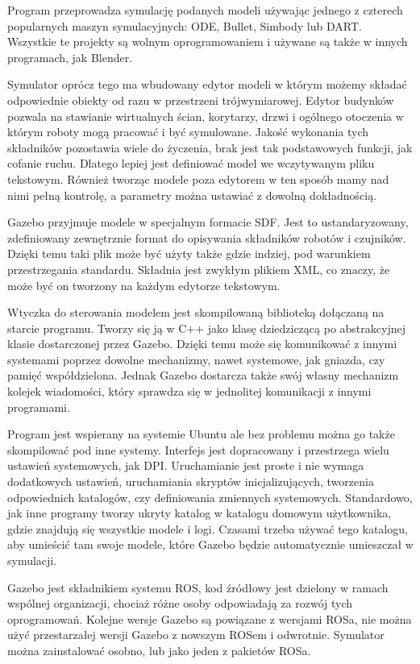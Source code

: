 Program przeprowadza symulację podanych modeli używając jednego z czterech popularnych maszyn symulacyjnych: ODE, Bullet, Simbody lub DART.
Wszystkie te projekty są wolnym oprogramowaniem i używane są także w innych programach, jak Blender.

Symulator oprócz tego ma wbudowany edytor modeli w którym możemy składać odpowiednie obiekty od razu w przestrzeni trójwymiarowej.
Edytor budynków pozwala na stawianie wirtualnych ścian, korytarzy, drzwi i ogólnego otoczenia w którym roboty mogą pracować i być symulowane.
Jakość wykonania tych składników pozostawia wiele do życzenia, brak jest tak podstawowych funkcji, jak cofanie ruchu.
Dlatego lepiej jest definiować model we wczytywanym pliku tekstowym.
Również tworząc modele poza edytorem w ten sposób mamy nad nimi pełną kontrolę, a parametry można ustawiać z dowolną dokładnością.

Gazebo przyjmuje modele w specjalnym formacie SDF. Jest to ustandaryzowany, zdefiniowany zewnętrznie format do opisywania składników robotów i czujników.
Dzięki temu taki plik może być użyty także gdzie indziej, pod warunkiem przestrzegania standardu.
Składnia jest zwykłym plikiem XML, co znaczy, że może być on tworzony na każdym edytorze tekstowym.

Wtyczka do sterowania modelem jest skompilowaną biblioteką dołączaną na starcie programu.
Tworzy się ją w C++ jako klasę dziedziczącą po abstrakcyjnej klasie dostarczonej przez Gazebo.
Dzięki temu może się komunikować z innymi systemami poprzez dowolne mechanizmy, nawet systemowe, jak gniazda, czy pamięć współdzielona.
Jednak Gazebo dostarcza także swój własny mechanizm kolejek wiadomości, który sprawdza się w jednolitej komunikacji z innymi programami.

Program jest wspierany na systemie Ubuntu ale bez problemu można go także skompilować pod inne systemy.
Interfejs jest dopracowany i przestrzega wielu ustawień systemowych, jak DPI.
Uruchamianie jest proste i nie wymaga dodatkowych ustawień, uruchamiania skryptów inicjalizujących, tworzenia odpowiednich katalogów, czy definiowania zmiennych systemowych.
Standardowo, jak inne programy tworzy ukryty katalog w katalogu domowym użytkownika, gdzie znajdują się wszystkie modele i logi.
Czasami trzeba używać tego katalogu, aby umieścić tam swoje modele, które Gazebo będzie automatycznie umieszczał w symulacji.

Gazebo jest składnikiem systemu ROS, kod źródłowy jest dzielony w ramach wspólnej organizacji, chociaż różne osoby odpowiadają za rozwój tych oprogramowań.
Kolejne wersje Gazebo są powiązane z wersjami ROSa, nie można użyć przestarzałej wersji Gazebo z nowszym ROSem i odwrotnie.
Symulator można zainstalować osobno, lub jako jeden z pakietów ROSa.

